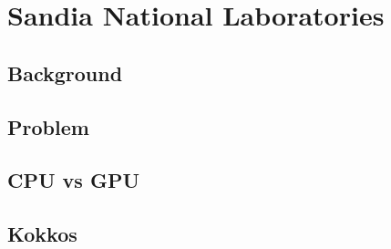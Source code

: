 \chapter{Sandia National Laboratories}
\section{Background}
\section{Problem}
\section{CPU vs GPU}
\section{Kokkos}

